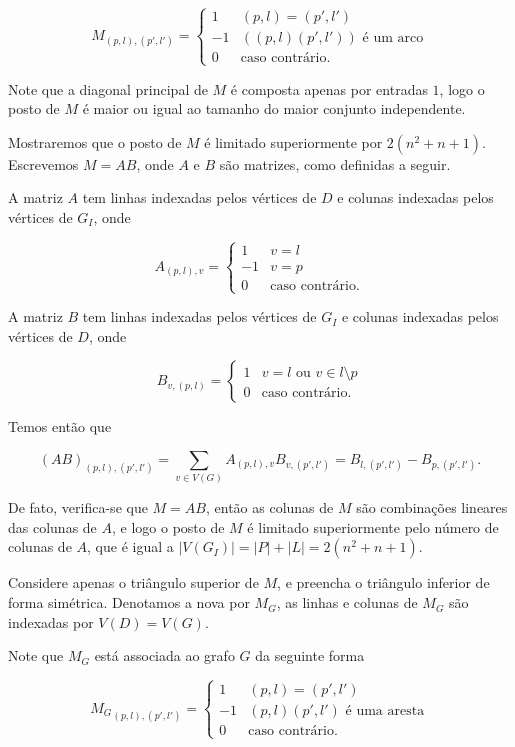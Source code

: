 \[ M_{(p,l),(p',l')} = \begin{cases} 
      1 & (p,l) = (p',l') \\
      -1 & ((p,l)(p',l')) \text{ é um arco} \\
      0 & \text{caso contrário.}
   \end{cases}
\]

Note que a diagonal principal de $M$ é composta apenas por entradas $1$, logo o posto de $M$ é maior ou igual ao tamanho do maior conjunto independente.

Mostraremos que o posto de $M$ é limitado superiormente por $2(n^2 + n + 1)$. Escrevemos $M = AB$, onde $A$ e $B$ são matrizes, como definidas a seguir.

A matriz $A$ tem linhas indexadas pelos vértices de $D$ e colunas indexadas pelos vértices de $G_I$, onde

\[ A_{(p,l),v} = \begin{cases} 
      1 & v = l \\
      -1 & v = p \\
      0 & \text{caso contrário.}
   \end{cases}
\]

A matriz $B$ tem linhas indexadas pelos vértices de $G_I$ e colunas indexadas pelos vértices de $D$, onde

\[ B_{v,(p,l)} = \begin{cases} 
      1 & v = l \text{ ou } v\in l \setminus p\\
      0 & \text{caso contrário.}
   \end{cases}
\]

Temos então que 

\[(AB)_{(p,l),(p',l')} = \sum\limits_{v \in V(G)} A_{(p,l),v} B_{v,(p',l')} = B_{l,(p',l')} - B_{p,(p',l')}.\]

De fato, verifica-se que $M = AB$, então as colunas de $M$ são combinações lineares das colunas de $A$, e logo o posto de $M$ é limitado superiormente pelo número de colunas de $A$, que é igual a $|V(G_I)| = |P| + |L| = 2(n^2 + n + 1)$.

Considere apenas o triângulo superior de $M$, e preencha o triângulo inferior de forma simétrica. Denotamos a nova por $M_G$, as linhas e colunas de $M_G$ são indexadas por $V(D) = V(G)$.

Note que $M_G$ está associada ao grafo $G$ da seguinte forma

\[ {M_G}_{(p,l), (p',l')} = \begin{cases} 
      1 & (p,l) = (p',l')\\
      -1 & (p,l)(p',l') \text{ é uma aresta}\\
      0 & \text{caso contrário.}
   \end{cases}
\]

